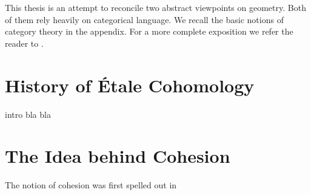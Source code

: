 This thesis is an attempt to reconcile two abstract viewpoints on geometry. Both of them rely heavily on categorical language. We recall the basic notions of category theory in the appendix. For a more complete exposition we refer the reader to \cite{riehl:2016}.
\section*{History of \'Etale Cohomology}
intro bla bla
\cite{milneLEC}
\section*{The Idea behind Cohesion}
The notion of cohesion was first spelled out in \cite{lawvere:2007}